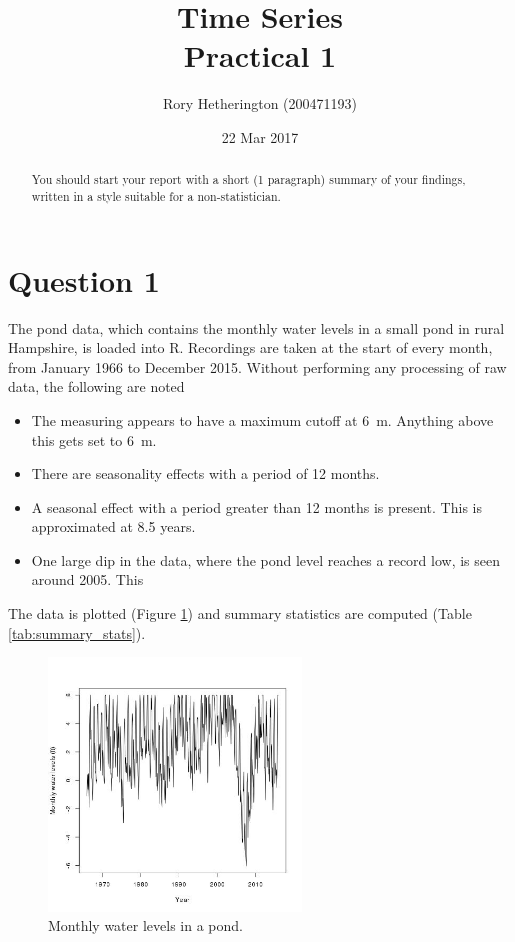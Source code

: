 \documentclass[a4paper]{article}
\title{Time Series\\ Practical 1}
\author{Rory Hetherington (200471193)}
\date{22 Mar 2017}
\begin{document}
\maketitle


\begin{abstract}
	\centering
	You should start your report with a short (1 paragraph)	summary of your findings, written in a style suitable for a non-statistician.
\end{abstract}


\section*{Question 1}
The pond data, which contains the monthly water levels in a small pond in rural Hampshire, is loaded into \textsf{R}. Recordings are taken at the start of every month, from January 1966 to December 2015. Without performing any processing of raw data, the following are noted

\begin{itemize}
	\item The measuring appears to have a maximum cutoff at \SI{6}{m}. Anything above this gets set to \SI{6}{m}. 
	\item There are seasonality effects with a period of 12 months. 
	\item A seasonal effect with a period greater than 12 months is present. This is approximated at 8.5 years.
	\item One large dip in the data, where the pond level reaches a record low, is seen around 2005. This 
\end{itemize}

The data is plotted (Figure \ref{fig:plot_data}) and summary statistics are computed (Table \ref{tab:summary_stats}).

\begin{figure} [H]
	\centering
	\includegraphics[width=0.6\textwidth]{plot_data}
	\caption{Monthly water levels in a pond.}
	\label{fig:plot_data}
\end{figure}
\end{document}
